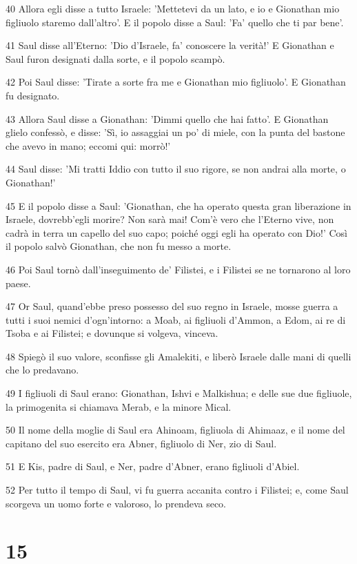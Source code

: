 \par 40 Allora egli disse a tutto Israele: 'Mettetevi da un lato, e io e Gionathan mio figliuolo staremo dall'altro'. E il popolo disse a Saul: 'Fa' quello che ti par bene'.
\par 41 Saul disse all'Eterno: 'Dio d'Israele, fa' conoscere la verità!' E Gionathan e Saul furon designati dalla sorte, e il popolo scampò.
\par 42 Poi Saul disse: 'Tirate a sorte fra me e Gionathan mio figliuolo'. E Gionathan fu designato.
\par 43 Allora Saul disse a Gionathan: 'Dimmi quello che hai fatto'. E Gionathan glielo confessò, e disse: 'Sì, io assaggiai un po' di miele, con la punta del bastone che avevo in mano; eccomi qui: morrò!'
\par 44 Saul disse: 'Mi tratti Iddio con tutto il suo rigore, se non andrai alla morte, o Gionathan!'
\par 45 E il popolo disse a Saul: 'Gionathan, che ha operato questa gran liberazione in Israele, dovrebb'egli morire? Non sarà mai! Com'è vero che l'Eterno vive, non cadrà in terra un capello del suo capo; poiché oggi egli ha operato con Dio!' Così il popolo salvò Gionathan, che non fu messo a morte.
\par 46 Poi Saul tornò dall'inseguimento de' Filistei, e i Filistei se ne tornarono al loro paese.
\par 47 Or Saul, quand'ebbe preso possesso del suo regno in Israele, mosse guerra a tutti i suoi nemici d'ogn'intorno: a Moab, ai figliuoli d'Ammon, a Edom, ai re di Tsoba e ai Filistei; e dovunque si volgeva, vinceva.
\par 48 Spiegò il suo valore, sconfisse gli Amalekiti, e liberò Israele dalle mani di quelli che lo predavano.
\par 49 I figliuoli di Saul erano: Gionathan, Ishvi e Malkishua; e delle sue due figliuole, la primogenita si chiamava Merab, e la minore Mical.
\par 50 Il nome della moglie di Saul era Ahinoam, figliuola di Ahimaaz, e il nome del capitano del suo esercito era Abner, figliuolo di Ner, zio di Saul.
\par 51 E Kis, padre di Saul, e Ner, padre d'Abner, erano figliuoli d'Abiel.
\par 52 Per tutto il tempo di Saul, vi fu guerra accanita contro i Filistei; e, come Saul scorgeva un uomo forte e valoroso, lo prendeva seco.

\chapter{15}

